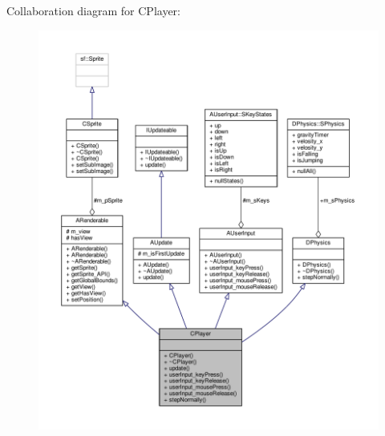 Collaboration diagram for C\-Player\-:\nopagebreak
\begin{figure}[H]
\begin{center}
\leavevmode
\includegraphics[width=350pt]{classCPlayer__coll__graph}
\end{center}
\end{figure}

